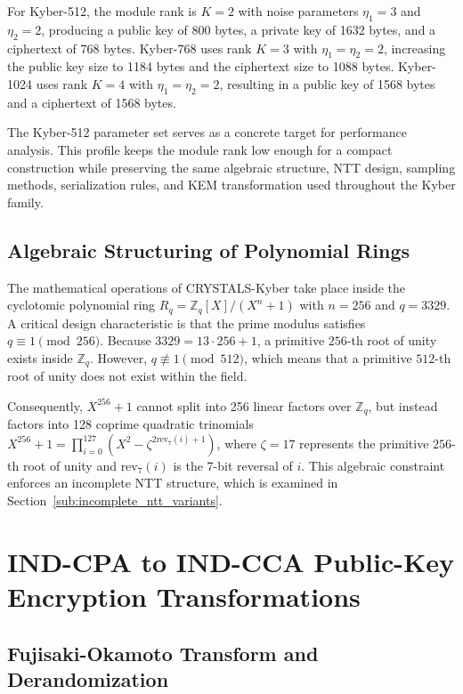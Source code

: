 For Kyber-512, the module rank is $K = 2$ with noise parameters $\eta_1 = 3$ and $\eta_2 = 2$, producing a public key of 800 bytes, a private key of 1632 bytes, and a ciphertext of 768 bytes. Kyber-768 uses rank $K = 3$ with $\eta_1 = \eta_2 = 2$, increasing the public key size to 1184 bytes and the ciphertext size to 1088 bytes. Kyber-1024 uses rank $K = 4$ with $\eta_1 = \eta_2 = 2$, resulting in a public key of 1568 bytes and a ciphertext of 1568 bytes.

The Kyber-512 parameter set serves as a concrete target for performance analysis. This profile keeps the module rank low enough for a compact construction while preserving the same algebraic structure, NTT design, sampling methods, serialization rules, and KEM transformation used throughout the Kyber family.

\subsection{Algebraic Structuring of Polynomial Rings}
\label{sub:algebraic_structuring_rings}

The mathematical operations of CRYSTALS-Kyber take place inside the cyclotomic polynomial ring $R_q = \mathbb{Z}_q[X]/(X^n + 1)$ with $n = 256$ and $q = 3329$. A critical design characteristic is that the prime modulus satisfies $q \equiv 1 \pmod{256}$. Because $3329 = 13 \cdot 256 + 1$, a primitive $256$-th root of unity exists inside $\mathbb{Z}_q$. However, $q \not\equiv 1 \pmod{512}$, which means that a primitive $512$-th root of unity does not exist within the field.

Consequently, $X^{256} + 1$ cannot split into 256 linear factors over $\mathbb{Z}_q$, but instead factors into 128 coprime quadratic trinomials $X^{256} + 1 = \prod_{i=0}^{127} (X^2 - \zeta^{2\text{rev}_7(i)+1})$, where $\zeta = 17$ represents the primitive $256$-th root of unity and $\text{rev}_7(i)$ is the 7-bit reversal of $i$. This algebraic constraint enforces an incomplete NTT structure, which is examined in Section~\ref{sub:incomplete_ntt_variants}.

\section{IND-CPA to IND-CCA Public-Key Encryption Transformations}
\label{sec:ind_cca_transformations}

\subsection{Fujisaki-Okamoto Transform and Derandomization}
\label{sub:fujisaki_okamoto_derandomization}

